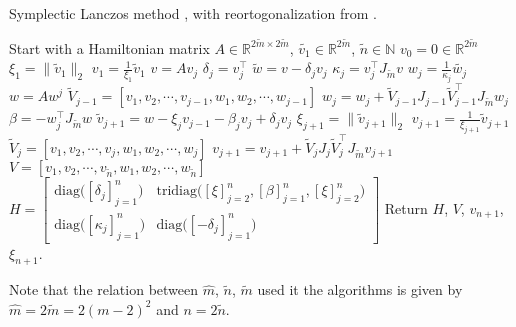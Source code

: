 \begin{algorithm} \caption{Symplectic Lanczos method \cite{SLM}, with reortogonalization from \cite{SLMO}. } \label{alg:symlanz}
\begin{algorithmic}
\STATE Start with a Hamiltonian matrix $A \in \mathbb{R}^{2\tilde{m} \times 2 \tilde{m}}$, $\tilde{v_1} \in \mathbb{R}^{2 \tilde{m}}$, $\tilde{n} \in \mathbb{N}$
\STATE $v_0= 0 \in \mathbb{R}^{2 \tilde{m}}$
\STATE $\xi_1 = \| \tilde{v}_1\|_2$
\STATE $v_1= \frac{1}{\xi_1}  \tilde{v}_1$
	\STATE $v = A v_j$
	\STATE $\delta_j =  v_j^\top$
	\STATE $\tilde{w} = v-\delta_j v_j$
	\STATE $\kappa_j = v_j^\top J_{\tilde{m}} v $
	\STATE $w_j = \frac{1}{\kappa_j} \tilde{w_j}$
	\STATE $w = A w^j$
	\STATE $ \tilde{V}_{j-1} = [v_1,v_2,\cdots,v_{j-1},w_1,w_2,\cdots,w_{j-1}] $
	\STATE $ w_j = w_j + \tilde{V}_{j-1}J_{j-1} \tilde{V}_{j-1}^\top J_{\tilde{m}} w_j $
	\STATE $\beta = -w_j^\top J_{\tilde{m}} w$
	\STATE $\tilde{v}_{j+1} = w - \xi_j v_{j-1} - \beta_j v_j + \delta_j v_j$
	\STATE $ \xi_{j+1} = \|\tilde{v}_{j+1} \|_2 $
	\STATE $ v_{j+1} = \frac{1}{\xi_{j+1}} \tilde{v}_{j+1} $
	\STATE $ \tilde{V}_j = [v_1,v_2,\cdots,v_{j},w_1,w_2,\cdots,w_{j}] $
	\STATE $ v_{j+1} = v_{j+1} + \tilde{V}_j J_j \tilde{V}_j^\top J_{\tilde{m}} v_{j+1} $
\ENDFOR
\STATE $V = [v_1,v_2,\cdots,v_{\tilde{n}},w_1,w_2,\cdots,w_{\tilde{n}}]$
\STATE $H = \begin{bmatrix}
\text{diag} \big( [\delta_j]^n_{j=1} \big) & \text{tridiag}\big( [\xi]_{j=2}^n,[\beta]_{j=1}^n,[\xi]_{j=2}^n \big) \\
\text{diag} \big( [\kappa_j]^n_{j=1} \big) & \text{diag} \big( [-\delta_j]^n_{j=1} \big)
\end{bmatrix} $
\STATE Return $H$, $V$, $v_{n+1}$, $\xi_{n+1}$.
\end{algorithmic}
\end{algorithm}
Note that the relation between $\hat{m}$, $\tilde{n}$, $\tilde{m}$ used it the algorithms is given by $\hat{m} = 2\tilde{m}= 2(m-2)^2$ and $ n = 2\tilde{n}$.

